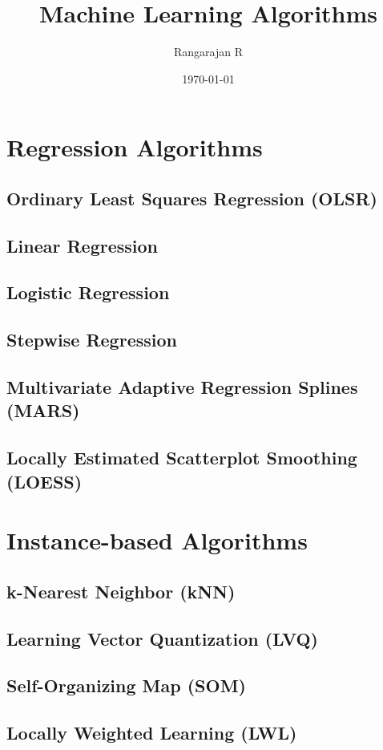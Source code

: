\documentclass[14pt]{book}
\date{\today}
\begin{document}
\tableofcontents
\title{Machine Learning Algorithms}
\author{Rangarajan R}
\maketitle
\chapter{Regression Algorithms}
\section{Ordinary Least Squares Regression (OLSR)}
\section{Linear Regression}
\section{Logistic Regression}
\section{Stepwise Regression} 
\section{Multivariate Adaptive Regression Splines (MARS)}
\section{Locally Estimated Scatterplot Smoothing (LOESS)}
\chapter{Instance-based Algorithms}
\section{k-Nearest Neighbor (kNN)}
\section{Learning Vector Quantization (LVQ)}
\section{Self-Organizing Map (SOM)}
\section{Locally Weighted Learning (LWL)}
\end{document}

